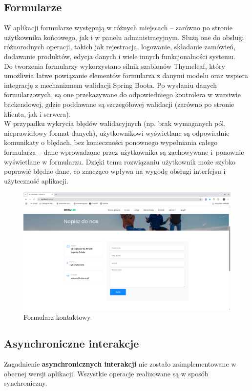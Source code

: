 \documentclass[12pt]{article}
\begin{document}
	\subsection{Formularze}
	W aplikacji formularze występują w różnych miejscach – zarówno po stronie użytkownika końcowego, jak i w panelu administracyjnym. Służą one do obsługi różnorodnych operacji, takich jak rejestracja, logowanie, składanie zamówień, dodawanie produktów, edycja danych i wiele innych funkcjonalności systemu. \\
	Do tworzenia formularzy wykorzystano silnik szablonów Thymeleaf, który umożliwia łatwe powiązanie elementów formularza z danymi modelu oraz wspiera integrację z mechanizmem walidacji Spring Boota. Po wysłaniu danych formularzowych, są one przekazywane do odpowiedniego kontrolera w warstwie backendowej, gdzie poddawane są szczegółowej walidacji (zarówno po stronie klienta, jak i serwera).\\
	W przypadku wykrycia błędów walidacyjnych (np. brak wymaganych pól, nieprawidłowy format danych), użytkownikowi wyświetlane są odpowiednie komunikaty o błędach, bez konieczności ponownego wypełniania całego formularza – dane wprowadzone przez użytkownika są zachowywane i~ponownie wyświetlane w formularzu. Dzięki temu rozwiązaniu użytkownik może szybko poprawić błędne dane, co znacząco wpływa na wygodę obsługi interfejsu i użyteczność aplikacji.
	\begin{figure}[H]
		\centering
		\includegraphics[width=1\linewidth]{formularz}
		\caption{Formularz kontaktowy}
		\label{fig:formularz}
	\end{figure}
	
	\subsection{Asynchroniczne interakcje}
	Zagadnienie \textbf{asynchronicznych interakcji} nie zostało zaimplementowane w obecnej wersji aplikacji. Wszystkie operacje realizowane są w sposób synchroniczny.
	
\end{document}
